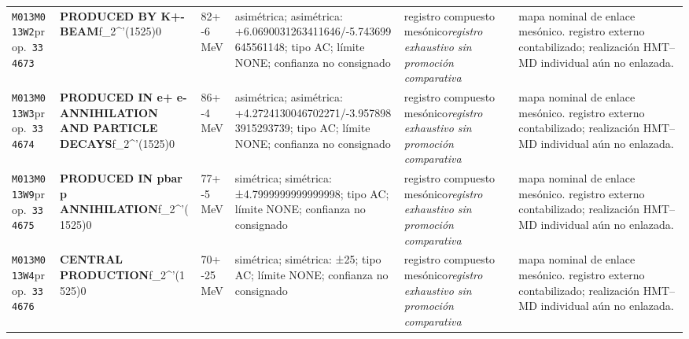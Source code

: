 \begin{landscape}
\begin{longtable}{L{1.85cm}L{4.45cm}L{2.35cm}L{4.05cm}L{3.35cm}L{7.15cm}}
\texttt{M013}\newline \texttt{M013W2}\newline prop.\ \texttt{334673} & \textbf{PRODUCED BY K+- BEAM}\newline f\_\allowbreak{}2\textasciicircum{}'(1525)0 & 82+-6\,MeV & asimétrica; asimétrica: +6.0690031263411646/-5.743699645561148; tipo AC; límite NONE; confianza no consignado & registro compuesto mesónico\newline \emph{registro exhaustivo sin promoción comparativa} & mapa nominal de enlace mesónico. registro externo contabilizado; realización HMT--MD individual aún no enlazada. \\
\texttt{M013}\newline \texttt{M013W3}\newline prop.\ \texttt{334674} & \textbf{PRODUCED IN e+ e- ANNIHILATION AND PARTICLE DECAYS}\newline f\_\allowbreak{}2\textasciicircum{}'(1525)0 & 86+-4\,MeV & asimétrica; asimétrica: +4.2724130046702271/-3.9578983915293739; tipo AC; límite NONE; confianza no consignado & registro compuesto mesónico\newline \emph{registro exhaustivo sin promoción comparativa} & mapa nominal de enlace mesónico. registro externo contabilizado; realización HMT--MD individual aún no enlazada. \\
\texttt{M013}\newline \texttt{M013W9}\newline prop.\ \texttt{334675} & \textbf{PRODUCED IN pbar p ANNIHILATION}\newline f\_\allowbreak{}2\textasciicircum{}'(1525)0 & 77+-5\,MeV & simétrica; simétrica: ±4.7999999999999998; tipo AC; límite NONE; confianza no consignado & registro compuesto mesónico\newline \emph{registro exhaustivo sin promoción comparativa} & mapa nominal de enlace mesónico. registro externo contabilizado; realización HMT--MD individual aún no enlazada. \\
\texttt{M013}\newline \texttt{M013W4}\newline prop.\ \texttt{334676} & \textbf{CENTRAL PRODUCTION}\newline f\_\allowbreak{}2\textasciicircum{}'(1525)0 & 70+-25\,MeV & simétrica; simétrica: ±25; tipo AC; límite NONE; confianza no consignado & registro compuesto mesónico\newline \emph{registro exhaustivo sin promoción comparativa} & mapa nominal de enlace mesónico. registro externo contabilizado; realización HMT--MD individual aún no enlazada. \\

\end{longtable}
\end{landscape}
